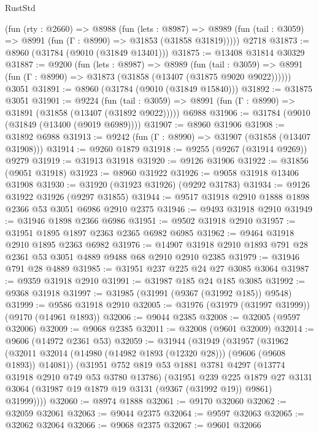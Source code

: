\begin{lexlean}{RustStd}
\begin{coremodule}
    (fun (rty : @2660) =>
    @8988
      (fun (lets : @8987) =>
      @8989 (fun (tail : @3059) => @8991 (fun (Γ : @8990) => @31853 (@31858 @31819)))))
    @2718
@31873 := @8960 (@31784 (@9010 (@31849 @13401)))
@31875 := @13408 @31814 @30329
@31887 := @9200
    (fun (lets : @8987) =>
    @8989
      (fun (tail : @3059) =>
      @8991 (fun (Γ : @8990) => @31873 (@31858 (@13407 (@31875 @9020 @9022))))))
    @3051
@31891 := @8960 (@31784 (@9010 (@31849 @15840)))
@31892 := @31875 @3051
@31901 := @9224
    (fun (tail : @3059) => @8991 (fun (Γ : @8990) => @31891 (@31858 (@13407 (@31892 @9022)))))
    @6988
@31906 := @31784 (@9010 (@31849 (@13400 (@9019 @6989))))
@31907 := @8960 @31906
@31908 := @31892 @6988
@31913 := @9242 (fun (Γ : @8990) => @31907 (@31858 (@13407 @31908)))
@31914 := @9260 @1879
@31918 := @9255 (@9267 (@31914 @9269)) @9279
@31919 := @31913 @31918
@31920 := @9126 @31906
@31922 := @31856 (@9051 @31918)
@31923 := @8960 @31922
@31926 := @9058 @31918 @13406 @31908
@31930 := @31920 (@31923 @31926) (@9292 @31783)
@31934 := @9126 @31922 @31926 (@9297 @31855)
@31944 := @9517 @31918 @2910 @1888 @1898 @2366 @53 @3051 @6986 @2910 @2375
@31946 := @9493 @31918 @2910
@31949 := @31946 @1898 @2366 @6986
@31951 := @9502 @31918 @2910
@31957 := @31951 @1895 @1897 @2363 @2365 @6982 @6985
@31962 := @9464 @31918 @2910 @1895 @2363 @6982
@31976 := @14907 @31918 @2910 @1893 @791 @28 @2361 @53 @3051 @4889 @9488 @68 @2910 @2910 @2385
@31979 := @31946 @791 @28 @4889
@31985 := @31951 @237 @225 @24 @27 @3085 @3064
@31987 := @9359 @31918 @2910
@31991 := @31987 @185 @24 @185 @3085
@31992 := @9368 @31918
@31997 := @31985 (@31991 (@9367 (@31992 @185)) @9548)
@31999 := @9586 @31918 @2910
@32005 := @31976 (@31979 (@31997 @31999)) (@9170 (@14961 @1893))
@32006 := @9044 @2385
@32008 := @32005 (@9597 @32006)
@32009 := @9068 @2385
@32011 := @32008 (@9601 @32009)
@32014 := @9606 (@14972 @2361 @53)
@32059 := @31944
    (@31949
      (@31957
        (@31962 (@32011 @32014 (@14980 (@14982 @1893 (@12320 @28))) (@9606 (@9608 @1893)) @14081))
        (@31951
          @752
          @819
          @53
          @1881
          @3781
          @4297
          (@13774 @31918 @2910 @749 @53 @3780 @13786)
          (@31951
            @239
            @225
            @1879
            @27
            @3131
            @3064
            (@31987 @19 @1879 @19 @3131 (@9367 (@31992 @19)) @9861)
            @31999))))
@32060 := @8974 @1888
@32061 := @9170 @32060
@32062 := @32059 @32061
@32063 := @9044 @2375
@32064 := @9597 @32063
@32065 := @32062 @32064
@32066 := @9068 @2375
@32067 := @9601 @32066

\end{coremodule}
\end{lexlean}
